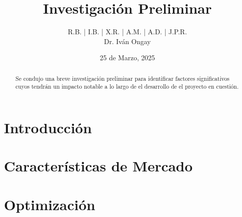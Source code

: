 \documentclass{article}
\title{\textbf{Investigación Preliminar}}
\author{R.B. | I.B. | X.R. | A.M. | A.D. | J.P.R. \\ Dr. Iván Ongay}
\date{25 de Marzo, 2025}
\begin{document}
\pagecolor{black} 
\color{white}
\maketitle


\begin{abstract}
    Se condujo una breve investigación preliminar para identificar factores significativos cuyos tendrán un impacto notable a lo largo de el desarrollo de el proyecto en cuestión. 
\end{abstract}

\begin{Large}
\tableofcontents
\end{Large}%
\pagebreak

\section{Introducción} \label{sec:intro}


\section{Características de Mercado} \label{sec:caracmerc}


\section{Optimización} \label{sec:optimiz}


 
\end{document}
